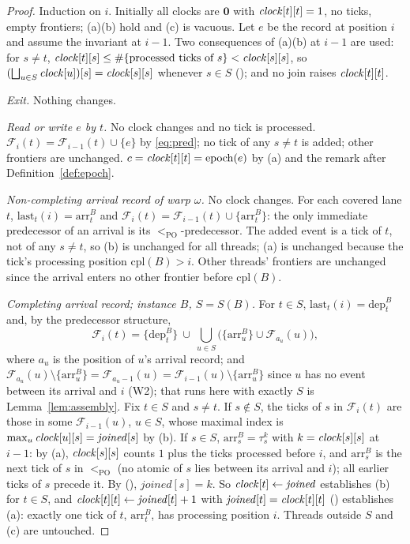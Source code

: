 \documentclass[11pt]{article}
\theoremstyle{remark}
\DeclareMathOperator{\epoch}{epoch}
\newcommand{\PO}{<_{\mathrm{PO}}}
\newcommand{\arr}[2]{\mathrm{arr}^{#2}_{#1}}
\newcommand{\dep}[2]{\mathrm{dep}^{#2}_{#1}}
\newcommand{\tick}[2]{\tau^{#2}_{#1}}
\newcommand{\Fr}{\mathcal{F}}
\begin{document}
\begin{proof}
Induction on $i$. Initially all clocks are $\mathbf{0}$ with
$\mathit{clock}[t][t]=1$, no ticks, empty frontiers; (a)(b) hold and (c) is
vacuous. Let $e$ be the record at position $i$ and assume the invariant at
$i-1$. Two consequences of (a)(b) at $i-1$ are used: for $s\ne t$,
$\mathit{clock}[t][s]\le\#\{\text{processed ticks of }s\}<\mathit{clock}[s][s]$, so
$(\bigsqcup_{u\in S}\mathit{clock}[u])[s]=\mathit{clock}[s][s]$ whenever $s\in S$
\textup{(\dag)}; and no join raises $\mathit{clock}[t][t]$.

\emph{Exit.} Nothing changes.

\emph{Read or write $e$ by $t$.} No clock changes and no tick is processed.
$\Fr_i(t)=\Fr_{i-1}(t)\cup\{e\}$ by \eqref{eq:pred}; no tick of any $s\ne t$
is added; other frontiers are unchanged. $c=\clk[t][t]=\epoch(e)$ by
(a) and the remark after Definition~\ref{def:epoch}.

\emph{Non-completing arrival record of warp $\omega$.} No clock changes. For
each covered lane $t$, $\mathrm{last}_t(i)=\arr{t}{B}$ and
$\Fr_i(t)=\Fr_{i-1}(t)\cup\{\arr{t}{B}\}$: the only immediate predecessor of
an arrival is its $\PO$-predecessor. The added event is a tick of $t$, not of
any $s\ne t$, so (b) is unchanged for all threads; (a) is unchanged because
the tick's processing position $\mathrm{cpl}(B)>i$. Other threads' frontiers
are unchanged since the arrival enters no other frontier before
$\mathrm{cpl}(B)$.

\emph{Completing arrival record; instance $B$, $S=S(B)$.} For $t\in S$,
$\mathrm{last}_t(i)=\dep{t}{B}$ and, by the predecessor structure,
\[
\Fr_i(t)=\{\dep{t}{B}\}\ \cup\ \bigcup_{u\in S}\bigl(\{\arr{u}{B}\}\cup\Fr_{a_u}(u)\bigr),
\]
where $a_u$ is the position of $u$'s arrival record; and
$\Fr_{a_u}(u)\setminus\{\arr{u}{B}\}=\Fr_{a_u-1}(u)=\Fr_{i-1}(u)\setminus\{\arr{u}{B}\}$
since $u$ has no event between its arrival and $i$ (W2); that \Sync{}
runs here with exactly $S$ is Lemma~\ref{lem:assembly}. Fix $t\in S$ and $s\ne t$. If $s\notin S$, the
ticks of $s$ in $\Fr_i(t)$ are those in some $\Fr_{i-1}(u)$, $u\in S$, whose
maximal index is $\max_u\mathit{clock}[u][s]=\mathit{joined}[s]$ by (b). If $s\in S$,
$\arr{s}{B}=\tick{s}{k}$ with $k=\mathit{clock}[s][s]$ at $i-1$: by (a),
$\mathit{clock}[s][s]$ counts $1$ plus the ticks processed before $i$, and
$\arr{s}{B}$ is the next tick of $s$ in $\PO$ (no atomic of $s$ lies between
its arrival and $i$); all earlier ticks of $s$ precede it. By \textup{(\dag)},
$\mathit{joined}[s]=k$. So $\mathit{clock}[t]\gets\mathit{joined}$ establishes (b) for
$t\in S$, and $\mathit{clock}[t][t]\gets\mathit{joined}[t]+1$ with
$\mathit{joined}[t]=\mathit{clock}[t][t]$ \textup{(\dag)} establishes (a): exactly one
tick of $t$, $\arr{t}{B}$, has processing position $i$. Threads outside $S$
and (c) are untouched.


\end{proof}
\end{document}
